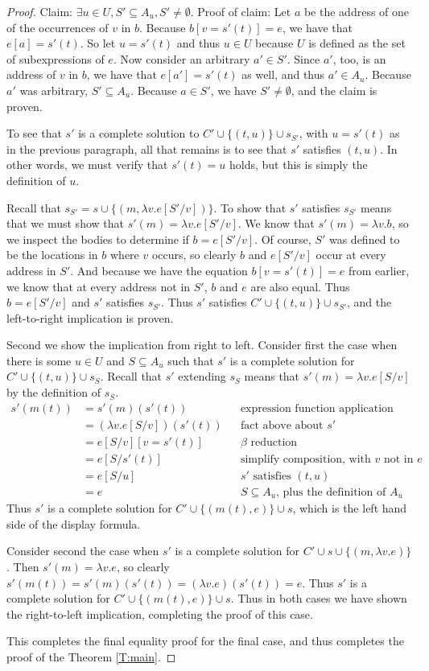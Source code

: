 \documentclass{article}
\begin{document}
\begin{proof}
Claim: $\exists u\in U, S'\subseteq A_u,S'\neq\emptyset$.  Proof of claim:  Let $a$ be the address of one of the occurrences of $v$ in $b$.  Because $b[v=s'(t)]=e$, we have that $e[a]=s'(t)$.  So let $u=s'(t)$ and thus $u\in U$ because $U$ is defined as the set of subexpressions of $e$.  Now consider an arbitrary $a'\in S'$.  Since $a'$, too, is an address of $v$ in $b$, we have that $e[a']=s'(t)$ as well, and thus $a'\in A_u$.  Because $a'$ was arbitrary, $S'\subseteq A_u$.  Because $a\in S'$, we have $S'\neq\emptyset$, and the claim is proven.

To see that $s'$ is a complete solution to $C'\cup\{(t,u)\}\cup s_{S'}$, with $u=s'(t)$ as in the previous paragraph, all that remains is to see that $s'$ satisfies $(t,u)$.  In other words, we must verify that $s'(t)=u$ holds, but this is simply the definition of $u$.

Recall that $s_{S'}=s\cup\{(m,\lambda v.e[S'/v])\}$.  To show that $s'$ satisfies $s_{S'}$ means that we must show that $s'(m)=\lambda v.e[S'/v]$.  We know that $s'(m)=\lambda v.b$, so we inspect the bodies to determine if $b=e[S'/v]$.  Of course, $S'$ was defined to be the locations in $b$ where $v$ occurs, so clearly $b$ and $e[S'/v]$ occur at every address in $S'$.  And because we have the equation $b[v=s'(t)]=e$ from earlier, we know that at every address not in $S'$, $b$ and $e$ are also equal.  Thus $b=e[S'/v]$ and $s'$ satisfies $s_{S'}$.  Thus $s'$ satisfies $C'\cup\{(t,u)\}\cup s_{S'}$, and the left-to-right implication is proven.

Second we show the implication from right to left.  Consider first the case when there is some $u\in U$ and $S\subseteq A_u$ such that $s'$ is a complete solution for $C'\cup\{(t,u)\}\cup s_S$.  Recall that $s'$ extending $s_S$ means that $s'(m)=\lambda v.e[S/v]$ by the definition of $s_S$.
	\begin{align*}
		s'(m(t))	&=	s'(m)(s'(t))					&&	\text{expression function application structure}	\\
					&=	(\lambda v.e[S/v])(s'(t))		&&	\text{fact above about $s'$}	\\
					&=	e[S/v][v=s'(t)]					&&	\text{$\beta$ reduction}	\\
					&=	e[S/s'(t)]						&&	\text{simplify composition, with $v$ not in $e$}	\\
					&=	e[S/u]							&&	\text{$s'$ satisfies $(t,u)$}	\\
					&=	e								&&	\text{$S\subseteq A_u$, plus the definition of $A_u$}
	\end{align*}
Thus $s'$ is a complete solution for $C'\cup\{(m(t),e)\}\cup s$, which is the left hand side of the display formula.

Consider second the case when $s'$ is a complete solution for $C'\cup s\cup\{(m,\lambda v.e)\}$.  Then $s'(m)=\lambda v.e$, so clearly $s'(m(t))=s'(m)(s'(t))=(\lambda v.e)(s'(t))=e$.  Thus $s'$ is a complete solution for $C'\cup\{(m(t),e)\}\cup s$.  Thus in both cases we have shown the right-to-left implication, completing the proof of this case.

This completes the final equality proof for the final case, and thus completes the proof of the Theorem \ref{T:main}.
\end{proof}
\end{document}
